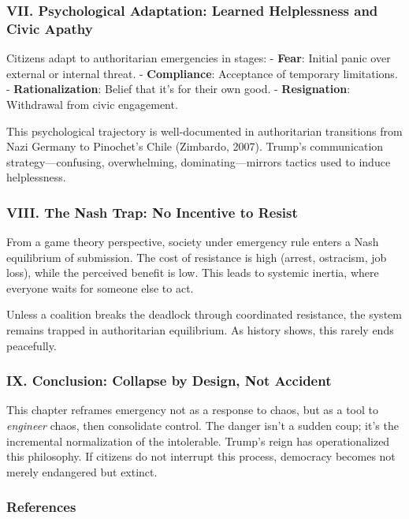 \subsubsection{VII. Psychological Adaptation: Learned Helplessness and
Civic
Apathy}\label{vii.-psychological-adaptation-learned-helplessness-and-civic-apathy}

Citizens adapt to authoritarian emergencies in stages: - \textbf{Fear}:
Initial panic over external or internal threat. - \textbf{Compliance}:
Acceptance of temporary limitations. - \textbf{Rationalization}: Belief
that it's for their own good. - \textbf{Resignation}: Withdrawal from
civic engagement.

This psychological trajectory is well-documented in authoritarian
transitions from Nazi Germany to Pinochet's Chile (Zimbardo, 2007).
Trump's communication strategy---confusing, overwhelming,
dominating---mirrors tactics used to induce helplessness.

\subsubsection{VIII. The Nash Trap: No Incentive to
Resist}\label{viii.-the-nash-trap-no-incentive-to-resist}

From a game theory perspective, society under emergency rule enters a
Nash equilibrium of submission. The cost of resistance is high (arrest,
ostracism, job loss), while the perceived benefit is low. This leads to
systemic inertia, where everyone waits for someone else to act.

Unless a coalition breaks the deadlock through coordinated resistance,
the system remains trapped in authoritarian equilibrium. As history
shows, this rarely ends peacefully.

\subsubsection{IX. Conclusion: Collapse by Design, Not
Accident}\label{ix.-conclusion-collapse-by-design-not-accident}

This chapter reframes emergency not as a response to chaos, but as a
tool to \emph{engineer} chaos, then consolidate control. The danger
isn't a sudden coup; it's the incremental normalization of the
intolerable. Trump's reign has operationalized this philosophy. If
citizens do not interrupt this process, democracy becomes not merely
endangered but extinct.

\subsubsection{References}\label{references}

